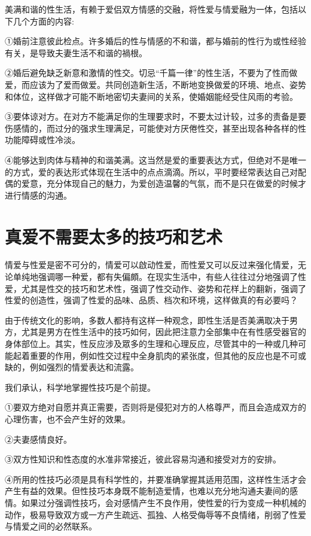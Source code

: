 \documentclass[12pt,UTF8]{ctexbook}
\begin{document}
美满和谐的性生活，有赖于爱侣双方情感的交融，将性爱与情爱融为一体，包括以下几个方面的内容:

①婚前注意彼此检点。许多婚后的性与情感的不和谐，都与婚前的性行为或性经验有关，是导致夫妻生活不和谐的禍根。

②婚后避免缺乏新意和激情的性交。切忌“千篇一律”的性生活，不要为了性而做爱，而应该为了爱而做爱。共同创造新生活，不断地变换做爱的环境、地点、姿势和体位，这样做才可能不断地密切夫妻间的关系，使婚姻能经受住风雨的考验。

③要体谅对方。在对方不能满足你的生理要求时，不要太过计较，过多的责备是要伤感情的，而过分的强求生理满足，可能使对方厌倦性交，甚至出现各种各样的性功能障碍或性冷淡。

④能够达到肉体与精神的和谐美满。这当然是爱的重要表达方式，但绝对不是唯一的方式，爱的表达形式体现在生活中的点点滴滴。所以，平时要经常表达自己对配偶的爱意，充分体现自己的魅力，为爱创造温馨的气氛，而不是只在做爱的时候才进行情感的沟通。

\section{真爱不需要太多的技巧和艺术}

情爱与性爱是密不可分的，情爱可以啟动性爱，而性爱又可以反过来强化情爱，无论单纯地强调哪一种爱，都有失偏頗。在现实生活中，有些人往往过分地强调了性爱，尤其是性交的技巧和艺术性，强调了性交动作、姿势和花样上的翻新，强调了性爱的创造性，强调了性爱的品味、品质、档次和环境，这样做真的有必要吗？

由于传统文化的影响，多数人都持有这样一种观念，即性生活是否美满取决于男方，尤其是男方在性生活中的技巧如何，因此把注意力全部集中在有性感受器官的身体部位上。其实，性反应涉及眾多的生理和心理反应，尽管其中的一种或几种可能起着重要的作用，例如性交过程中全身肌肉的紧张度，但其他的反应也是不可或缺的，例如强烈的情爱表达和流露。

我们承认，科学地掌握性技巧是个前提。

①要双方绝对自愿并真正需要，否则将是侵犯对方的人格尊严，而且会造成双方的心理伤害，也不会产生好的效果。

②夫妻感情良好。

③双方性知识和性态度的水准非常接近，彼此容易沟通和接受对方的安排。

④所用的性技巧必须是具有科学性的，并要准确掌握其适用范围，这样性生活才会产生有益的效果。但性技巧本身既不能制造爱情，也难以充分地沟通夫妻间的感情。如果过分强调性技巧，会对感情产生不良作用，使性爱的行为变成一种机械的动作，极易导致双方或一方产生疏远、孤独、人格受侮辱等不良情绪，削弱了性爱与情爱之间的必然联系。
\end{document}
